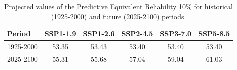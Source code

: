 \begin{table}[htbp]
\centering
\begin{tabular}{lccccc}
\toprule
Period & \textbf{SSP1-1.9} & \textbf{SSP1-2.6} & \textbf{SSP2-4.5} & \textbf{SSP3-7.0} & \textbf{SSP5-8.5} \\
\midrule
1925-2000 & 53.35 & 53.43 & 53.40 & 53.40 & 53.40 \\
2025-2100 & 55.31 & 55.68 & 57.04 & 59.04 & 61.03 \\
\bottomrule
\end{tabular}
\caption{Projected values of the Predictive Equivalent Reliability 10\% for historical (1925-2000) and future (2025-2100) periods.}
\label{tab:pred_scenarios_10per}
\end{table}